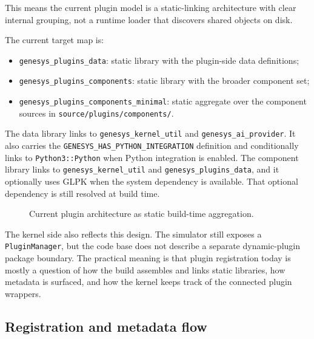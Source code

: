 This means the current plugin model is a static-linking architecture with
clear internal grouping, not a runtime loader that discovers shared objects
on disk.

The current target map is:
\begin{itemize}
 \item \texttt{genesys\_plugins\_data}: static library with the plugin-side
   data definitions;
 \item \texttt{genesys\_plugins\_components}: static library with the broader
   component set;
 \item \texttt{genesys\_plugins\_components\_minimal}: static aggregate over
   the component sources in \texttt{source/plugins/components/}.
\end{itemize}

The data library links to \texttt{genesys\_kernel\_util} and
\texttt{genesys\_ai\_provider}. It also carries the
\texttt{GENESYS\_HAS\_PYTHON\_INTEGRATION} definition and conditionally links
to \texttt{Python3::Python} when Python integration is enabled. The component
library links to \texttt{genesys\_kernel\_util} and
\texttt{genesys\_plugins\_data}, and it optionally uses GLPK when the system
dependency is available. That optional dependency is still resolved at build
time.

\begin{figure}[htbp]
\caption{Current plugin architecture as static build-time aggregation.}
\label{fig:plugin-static-architecture}
\end{figure}

The kernel side also reflects this design. The simulator still exposes a
\texttt{PluginManager}, but the code base does not describe a separate
dynamic-plugin package boundary. The practical meaning is that plugin
registration today is mostly a question of how the build assembles and links
static libraries, how metadata is surfaced, and how the kernel keeps track of
the connected plugin wrappers.

\subsection{Registration and metadata flow}
\label{subsec:plugin-registration-metadata}

